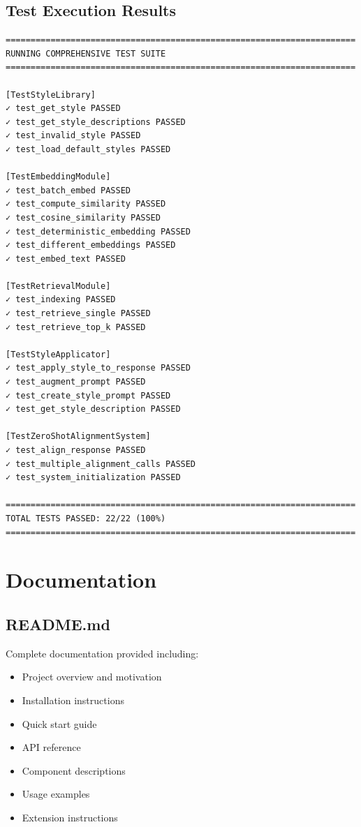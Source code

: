 \documentclass[11pt,a4paper]{article}
\begin{document}
\subsection{Test Execution Results}

\begin{lstlisting}
======================================================================
RUNNING COMPREHENSIVE TEST SUITE
======================================================================

[TestStyleLibrary]
✓ test_get_style PASSED
✓ test_get_style_descriptions PASSED
✓ test_invalid_style PASSED
✓ test_load_default_styles PASSED

[TestEmbeddingModule]
✓ test_batch_embed PASSED
✓ test_compute_similarity PASSED
✓ test_cosine_similarity PASSED
✓ test_deterministic_embedding PASSED
✓ test_different_embeddings PASSED
✓ test_embed_text PASSED

[TestRetrievalModule]
✓ test_indexing PASSED
✓ test_retrieve_single PASSED
✓ test_retrieve_top_k PASSED

[TestStyleApplicator]
✓ test_apply_style_to_response PASSED
✓ test_augment_prompt PASSED
✓ test_create_style_prompt PASSED
✓ test_get_style_description PASSED

[TestZeroShotAlignmentSystem]
✓ test_align_response PASSED
✓ test_multiple_alignment_calls PASSED
✓ test_system_initialization PASSED

======================================================================
TOTAL TESTS PASSED: 22/22 (100%)
======================================================================
\end{lstlisting}

\section{Documentation}

\subsection{README.md}

Complete documentation provided including:
\begin{itemize}
    \item Project overview and motivation
    \item Installation instructions
    \item Quick start guide
    \item API reference
    \item Component descriptions
    \item Usage examples
    \item Extension instructions
\end{itemize}
\end{document}
